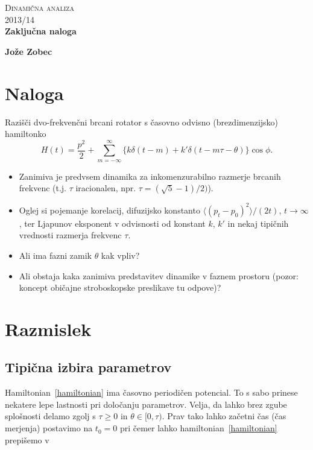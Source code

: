 \documentclass[a4paper, 12pt]{article}
\begin{document}
\begin{center}
\textsc{Dinami\v cna analiza}\\
\textsc{2013/14}\\[0.5cm]
\textbf{Zaklju\v cna naloga}
\end{center}
\begin{flushright}
\textbf{Jo\v ze Zobec}
\end{flushright}

\section{Naloga}

Razi\v s\v ci dvo-frekven\v cni brcani rotator s \v casovno odvisno (brezdimenzijsko) hamiltonko
\begin{equation}
	H(t) = \frac{p^2}{2} + \sum_{m = -\infty}^\infty \big\{k\delta(t - m) + k'\delta(t - m\tau - \theta)\big\}\cos\phi.
	\label{hamiltonian}
\end{equation}
\begin{itemize}
	\item{Zanimiva je predvsem dinamika za inkomenzurabilno razmerje brcanih frekvenc (t.j. $\tau$ iracionalen,
		npr. $\tau = (\sqrt{5} - 1)/2)$).}
	\item{Oglej si pojemanje korelacij, difuzijsko konstanto $\langle(p_t - p_0)^2\rangle/(2t)$, $t \to \infty$, ter
		Ljapunov eksponent v odvisnosti od konstant $k$, $k'$ in nekaj tipi\v cnih vrednosti razmerja frekvenc
		$\tau$.}
	\item{Ali ima fazni zamik $\theta$ kak vpliv?}
	\item{Ali obstaja kaka zanimiva predstavitev dinamike v faznem prostoru (pozor: koncept obi\v cajne stroboskopske
		preslikave tu odpove)?}
\end{itemize}

\section{Razmislek}

\subsection{Tipi\v cna izbira parametrov}

Hamiltonian~\eqref{hamiltonian} ima \v casovno periodi\v cen potencial. To s sabo prinese nekatere lepe lastnosti pri
dolo\v canju parametrov. Velja, da lahko brez zgube splo\v snosti delamo zgolj s $\tau \geq 0$ in $\theta \in [0, \tau)$.
Prav tako lahko za\v cetni \v cas (\v cas merjenja) postavimo na $t_0 = 0$ pri \v cemer lahko hamiltonian~\eqref{hamiltonian}
prepi\v semo v
\end{document}
